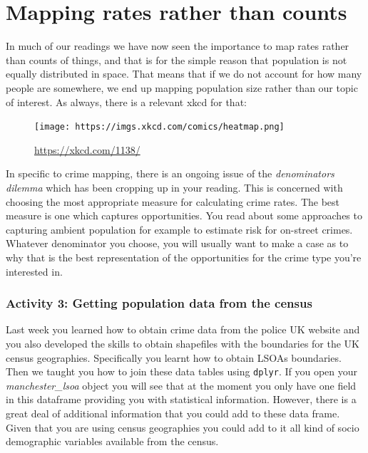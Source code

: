 \documentclass[
]{book}
\begin{document}
\hypertarget{mapping-rates-rather-than-counts}{%
\section{Mapping rates rather than counts}\label{mapping-rates-rather-than-counts}}

In much of our readings we have now seen the importance to map rates rather than counts of things, and that is for the simple reason that population is not equally distributed in space. That means that if we do not account for how many people are somewhere, we end up mapping population size rather than our topic of interest. As always, there is a relevant xkcd for that:

\begin{figure}
\centering
\texttt{[image: https://imgs.xkcd.com/comics/heatmap.png]}
\caption{\url{https://xkcd.com/1138/}}
\end{figure}

In specific to crime mapping, there is an ongoing issue of the \emph{denominators dilemma} which has been cropping up in your reading. This is concerned with choosing the most appropriate measure for calculating crime rates. The best measure is one which captures opportunities. You read about some approaches to capturing ambient population for example to estimate risk for on-street crimes. Whatever denominator you choose, you will usually want to make a case as to why that is the best representation of the opportunities for the crime type you're interested in.

\hypertarget{activity-3-getting-population-data-from-the-census}{%
\subsubsection{Activity 3: Getting population data from the census}\label{activity-3-getting-population-data-from-the-census}}

Last week you learned how to obtain crime data from the police UK website and you also developed the skills to obtain shapefiles with the boundaries for the UK census geographies. Specifically you learnt how to obtain LSOAs boundaries. Then we taught you how to join these data tables using \texttt{dplyr}. If you open your \emph{manchester\_lsoa} object you will see that at the moment you only have one field in this dataframe providing you with statistical information. However, there is a great deal of additional information that you could add to these data frame. Given that you are using census geographies you could add to it all kind of socio demographic variables available from the census.
\end{document}
